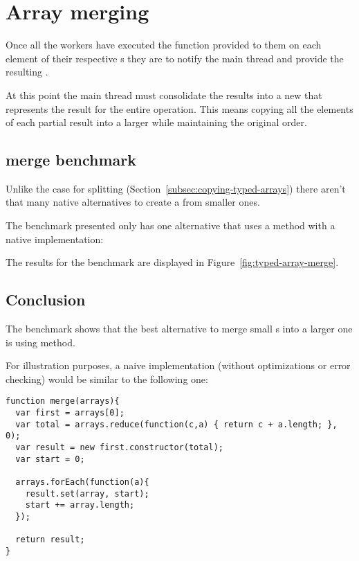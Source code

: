 \section{Array merging}

Once all the workers have executed the function provided to them on each element of their respective \ttarray{}s they are to notify the main thread and provide the resulting \ttarray{}.

At this point the main thread must consolidate the results into a new \ttarray{} that represents the result for the entire operation. This means copying all the elements of each partial result into a larger \ttarray{} while maintaining the original order.

\subsection{\ttarray{} merge benchmark}
Unlike the case for \ttarray{} splitting (Section~\ref{subsec:copying-typed-arrays}) there aren't that many native alternatives to create a \ttarray{} from smaller ones.

The benchmark presented only has one alternative that uses a method with a native implementation:

The results for the benchmark are displayed in Figure~\ref{fig:typed-array-merge}.

\subsection{Conclusion}
The benchmark shows that the best alternative to merge small \ttarray{}s into a larger one is using  method.

For illustration purposes, a naive implementation (without optimizations or error checking) would be similar to the following one:
\begin{lstlisting}[caption=Simple \ttarray{} merge function]
function merge(arrays){
  var first = arrays[0];
  var total = arrays.reduce(function(c,a) { return c + a.length; }, 0);
  var result = new first.constructor(total);
  var start = 0;

  arrays.forEach(function(a){
    result.set(array, start);
    start += array.length;
  });

  return result;
}
\end{lstlisting}

\pagebreak